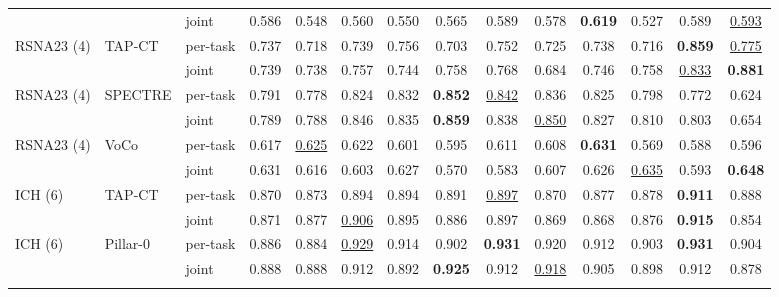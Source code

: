 \begin{tabular}{lllccccccccccc}
 &  & joint & 0.586 & \cellcolor{modebest}0.548 & \cellcolor{modebest}0.560 & 0.550 & 0.565 & \cellcolor{modebest}0.589 & 0.578 & \cellcolor{modebest}\textbf{0.619} & \cellcolor{modebest}0.527 & \cellcolor{modebest}0.589 & \underline{0.593} \\
\addlinespace[2pt]
RSNA23 (4) & TAP-CT & per-task & 0.737 & 0.718 & 0.739 & \cellcolor{modebest}0.756 & 0.703 & 0.752 & \cellcolor{modebest}0.725 & 0.738 & 0.716 & \cellcolor{modebest}\textbf{0.859} & \underline{0.775} \\
 &  & joint & \cellcolor{modebest}0.739 & \cellcolor{modebest}0.738 & \cellcolor{modebest}0.757 & 0.744 & \cellcolor{modebest}0.758 & \cellcolor{modebest}0.768 & 0.684 & \cellcolor{modebest}0.746 & \cellcolor{modebest}0.758 & \underline{0.833} & \cellcolor{modebest}\textbf{0.881} \\
\addlinespace[2pt]
RSNA23 (4) & SPECTRE & per-task & \cellcolor{modebest}0.791 & 0.778 & 0.824 & 0.832 & \textbf{0.852} & \cellcolor{modebest}\underline{0.842} & 0.836 & 0.825 & 0.798 & 0.772 & 0.624 \\
 &  & joint & 0.789 & \cellcolor{modebest}0.788 & \cellcolor{modebest}0.846 & \cellcolor{modebest}0.835 & \cellcolor{modebest}\textbf{0.859} & 0.838 & \cellcolor{modebest}\underline{0.850} & \cellcolor{modebest}0.827 & \cellcolor{modebest}0.810 & \cellcolor{modebest}0.803 & \cellcolor{modebest}0.654 \\
\addlinespace[2pt]
RSNA23 (4) & VoCo & per-task & 0.617 & \cellcolor{modebest}\underline{0.625} & \cellcolor{modebest}0.622 & 0.601 & \cellcolor{modebest}0.595 & \cellcolor{modebest}0.611 & \cellcolor{modebest}0.608 & \cellcolor{modebest}\textbf{0.631} & 0.569 & 0.588 & 0.596 \\
 &  & joint & \cellcolor{modebest}0.631 & 0.616 & 0.603 & \cellcolor{modebest}0.627 & 0.570 & 0.583 & 0.607 & 0.626 & \cellcolor{modebest}\underline{0.635} & \cellcolor{modebest}0.593 & \cellcolor{modebest}\textbf{0.648} \\
\addlinespace[2pt]
ICH (6) & TAP-CT & per-task & 0.870 & 0.873 & 0.894 & 0.894 & \cellcolor{modebest}0.891 & \underline{0.897} & \cellcolor{modebest}0.870 & \cellcolor{modebest}0.877 & \cellcolor{modebest}0.878 & \textbf{0.911} & \cellcolor{modebest}0.888 \\
 &  & joint & \cellcolor{modebest}0.871 & \cellcolor{modebest}0.877 & \cellcolor{modebest}\underline{0.906} & \cellcolor{modebest}0.895 & 0.886 & 0.897 & 0.869 & 0.868 & 0.876 & \cellcolor{modebest}\textbf{0.915} & 0.854 \\
\addlinespace[2pt]
ICH (6) & Pillar-0 & per-task & 0.886 & 0.884 & \cellcolor{modebest}\underline{0.929} & \cellcolor{modebest}0.914 & 0.902 & \cellcolor{modebest}\textbf{0.931} & \cellcolor{modebest}0.920 & \cellcolor{modebest}0.912 & \cellcolor{modebest}0.903 & \cellcolor{modebest}\textbf{0.931} & \cellcolor{modebest}0.904 \\
 &  & joint & \cellcolor{modebest}0.888 & \cellcolor{modebest}0.888 & 0.912 & 0.892 & \cellcolor{modebest}\textbf{0.925} & 0.912 & \underline{0.918} & 0.905 & 0.898 & 0.912 & 0.878 \\
\addlinespace[2pt]
\bottomrule
\end{tabular}
